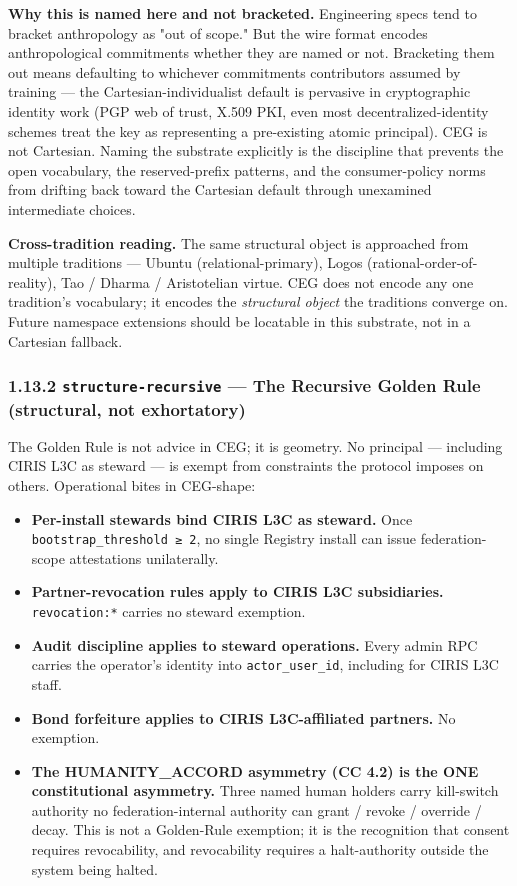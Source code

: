 \documentclass[11pt]{article}
\begin{document}
\textbf{Why this is named here and not bracketed.} Engineering specs tend to bracket anthropology as "out of scope." But the wire format encodes anthropological commitments whether they are named or not. Bracketing them out means defaulting to whichever commitments contributors assumed by training — the Cartesian-individualist default is pervasive in cryptographic identity work (PGP web of trust, X.509 PKI, even most decentralized-identity schemes treat the key as representing a pre-existing atomic principal). CEG is not Cartesian. Naming the substrate explicitly is the discipline that prevents the open vocabulary, the reserved-prefix patterns, and the consumer-policy norms from drifting back toward the Cartesian default through unexamined intermediate choices.


\textbf{Cross-tradition reading.} The same structural object is approached from multiple traditions — Ubuntu (relational-primary), Logos (rational-order-of-reality), Tao / Dharma / Aristotelian virtue. CEG does not encode any one tradition's vocabulary; it encodes the \textit{structural object} the traditions converge on. Future namespace extensions should be locatable in this substrate, not in a Cartesian fallback.


\subsubsection*{1.13.2 \texttt{structure-recursive} — The Recursive Golden Rule (structural, not exhortatory)}


The Golden Rule is not advice in CEG; it is geometry. No principal — including CIRIS L3C as steward — is exempt from constraints the protocol imposes on others. Operational bites in CEG-shape:


\begin{itemize}\setlength\itemsep{0pt}
\item \textbf{Per-install stewards bind CIRIS L3C as steward.} Once \texttt{bootstrap\_threshold ≥ 2}, no single Registry install can issue federation-scope attestations unilaterally.
\item \textbf{Partner-revocation rules apply to CIRIS L3C subsidiaries.} \texttt{revocation:*} carries no steward exemption.
\item \textbf{Audit discipline applies to steward operations.} Every admin RPC carries the operator's identity into \texttt{actor\_user\_id}, including for CIRIS L3C staff.
\item \textbf{Bond forfeiture applies to CIRIS L3C-affiliated partners.} No exemption.
\item \textbf{The HUMANITY\_ACCORD asymmetry (CC 4.2) is the ONE constitutional asymmetry.} Three named human holders carry kill-switch authority no federation-internal authority can grant / revoke / override / decay. This is not a Golden-Rule exemption; it is the recognition that consent requires revocability, and revocability requires a halt-authority outside the system being halted.
\end{itemize}
\end{document}
